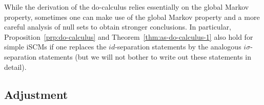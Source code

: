 While the derivation of the do-calculus relies essentially on the global Markov property, sometimes one
can make use of the global Markov property and a more careful analysis of null sets to obtain stronger conclusions.
In particular, Proposition~\ref{prp:do-calculus} and Theorem~\ref{thm:as-do-calculus-1} also hold for simple iSCMs
if one replaces the $id$-separation statements by the analogous $i\sigma$-separation statements (but we will not bother to write out these statements in detail).



\subsection{Adjustment}\label{sec:scms_adjustment}

